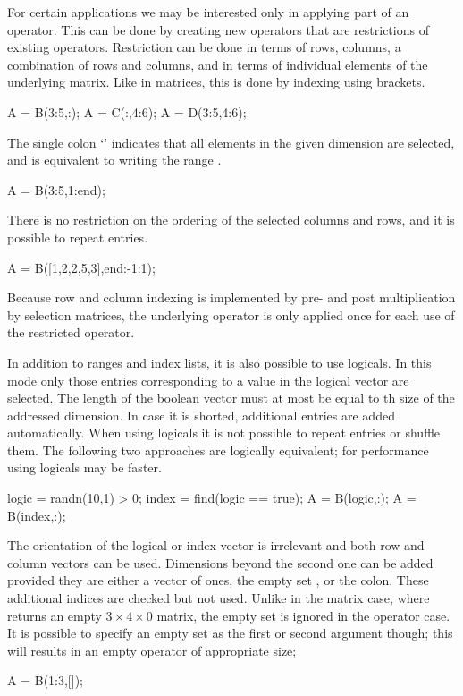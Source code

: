 For certain applications we may be interested only in applying part
of an operator. This can be done by creating new operators that are
restrictions of existing operators. Restriction can be done in terms
of rows, columns, a combination of rows and columns, and in terms of
individual elements of the underlying matrix. Like in matrices, this
is done by indexing using brackets. 
\begin{codeblock}
A = B(3:5,:);     %
A = C(:,4:6);     %
A = D(3:5,4:6);   %
\end{codeblock}
The single colon `\mlcmd{:}' indicates that all elements in the given
dimension are selected, and is equivalent to writing the range
.
\begin{codeblock}
A = B(3:5,1:end); %
\end{codeblock}
There is no restriction on the ordering of the selected columns and
rows, and it is possible to repeat entries.
\begin{codeblock}
A = B([1,2,2,5,3],end:-1:1); %
\end{codeblock}
Because row and column indexing is implemented by pre- and post
multiplication by selection matrices, the underlying operator is only
applied once for each use of the restricted operator.

In addition to ranges and index lists, it is also possible to use
logicals. In this mode only those entries corresponding to a
 value in the logical vector are selected. The length of
the boolean vector must at most be equal to th size of the addressed
dimension. In case it is shorted, additional  entries are
added automatically. When using logicals it is not possible to repeat
entries or shuffle them. The following two approaches are logically
equivalent; for performance using logicals may be faster.
\begin{codeblock}
logic = randn(10,1) > 0;
index = find(logic == true);
A = B(logic,:);
A = B(index,:); %
\end{codeblock}
The orientation of the logical or index vector is irrelevant and both
row and column vectors can be used. Dimensions beyond the second one
can be added provided they are either a vector of ones, the empty set
\mlcmd{[]}, or the colon. These additional indices are checked but not
used. Unlike in the matrix case, where  returns
an empty $3\times 4\times 0$ matrix, the empty set is ignored in the
operator case. It is possible to specify an empty set as the first or
second argument though; this will results in an empty operator of
appropriate size;
\begin{codeblock}
A = B(1:3,[]); %
\end{codeblock}

